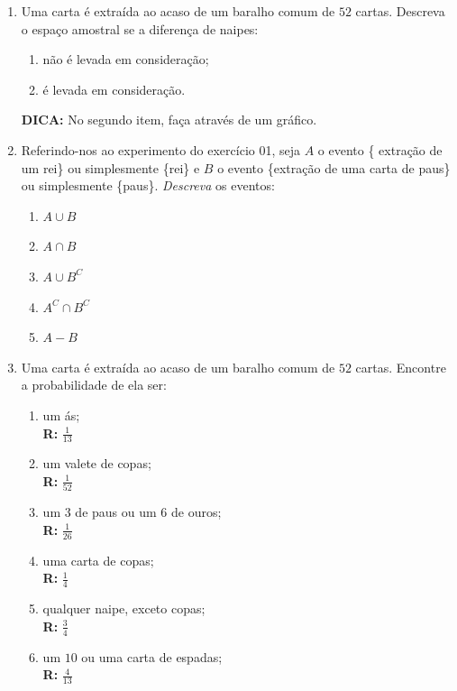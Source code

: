 \documentclass[oneside,a4paper,12pt]{article}
\begin{document}
\begin{enumerate}



	\item Uma carta é extraída ao acaso de um baralho comum de $52$ cartas. Descreva o espaço amostral se a diferença de naipes:
	\begin{enumerate}
		\item não é levada em consideração;
		\item é levada em consideração.
	\end{enumerate}
	
	\textbf{DICA: }No segundo item, faça através de um gráfico.

	\item Referindo-nos ao experimento do exercício 01, seja $A$ o evento \{ extração de um rei\} ou simplesmente \{rei\} e $B$ o evento \{extração de uma carta de paus\} ou simplesmente \{paus\}. \emph{Descreva} os eventos:
	\begin{enumerate}
		\item $A \cup B$
		\item $A \cap B$
		\item $A \cup B^{C}$
		\item $A^{C} \cap B^{C}$
		\item $A - B$
	\end{enumerate}

	\item Uma carta é extraída ao acaso de um baralho comum de $52$ cartas. Encontre a probabilidade de ela ser:
	\begin{enumerate}
		\item um ás; \\ {\bf R: } $\frac{1}{13}$
		\item um valete de copas; \\ {\bf R: } $\frac{1}{52}$
		\item um $3$ de paus ou um $6$ de ouros; \\ {\bf R: } $\frac{1}{26}$
		\item uma carta de copas; \\ {\bf R: } $\frac{1}{4}$
		\item qualquer naipe, exceto copas; \\ {\bf R: } $\frac{3}{4}$
		\item um $10$ ou uma carta de espadas; \\ {\bf R: } $\frac{4}{13}$
	\end{enumerate} 


\end{enumerate}
\end{document}
